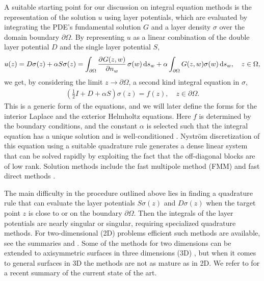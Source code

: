 \documentclass[hidelinks]{siamart1116}
\begin{document}
A suitable starting point for our discussion on integral equation
methods is the representation of the solution $u$ using layer
potentials, which are evaluated by integrating the PDE's fundamental
solution $G$ and a layer density ${\sigma}$ over the domain boundary
${{\partial\Omega}}$. By representing $u$ as a linear combination of the double
layer potential $D$ and the single layer potential $S$,
\begin{align}
  u(z) = D{\sigma}(z) + \alpha S{\sigma}(z)
  = \int_{{\partial\Omega}} \dpd{G(z,w)}{{{n}}_w} {\sigma}(w) \dif s_w
  + \alpha\int_{{\partial\Omega}} G(z, w) {\sigma}(w) \dif s_w, \quad z \in \Omega,
\end{align}
we get, by considering the limit $z \to {{\partial\Omega}}$, a second kind integral
equation in ${\sigma}$,
\begin{align}
  \left( \frac{1}{2}I + D + \alpha S \right){\sigma}(z) = f(z), \quad z \in {{\partial\Omega}} .
\end{align}
This is a generic form of the equations, and we will later define the
forms for the interior Laplace and the exterior Helmholtz
equations. Here $f$ is determined by the boundary conditions, and the
constant $\alpha$ is selected such that the integral equation has a
unique solution and is well-conditioned \cite{Betcke2011}. Nystr\"om
discretization of this equation using a suitable quadrature rule
generates a dense linear system that can be solved rapidly by
exploiting the fact that the off-diagonal blocks are of low
rank. Solution methods include the fast multipole method (FMM)
\cite{Greengard1997} and fast direct methods
\cite{Greengard2009,Ho2012,Martinsson2005}.

The main difficulty in the procedure outlined above lies in finding a
quadrature rule that can evaluate the layer potentials $S{\sigma}(z)$ and
$D{\sigma}(z)$ when the target point $z$ is close to or on the boundary
${{\partial\Omega}}$. Then the integrals of the layer potentials are nearly
singular or singular, requiring specialized quadrature methods. For
two-dimensional (2D) problems efficient such methods are available,
see the summaries \cite{Hao2014} and \cite{Helsing2015}. Some of the
methods for two dimensions can be extended to axisymmetric surfaces in
three dimensions (3D) \cite{Helsing2014}, but when it comes to general
surfaces in 3D the methods are not as mature as in 2D. We refer to
\cite{Rahimian2016} for a recent summary of the current state of the
art.
\end{document}
